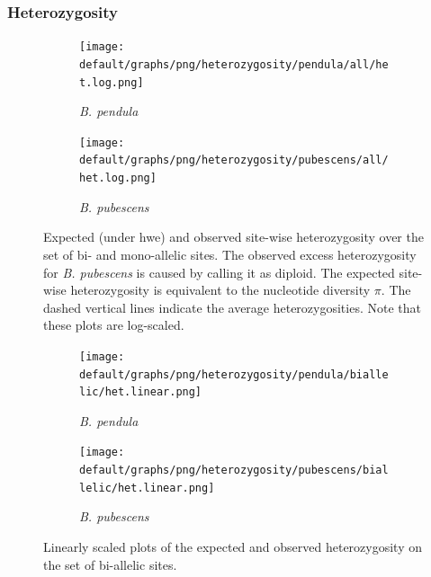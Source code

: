 \documentclass[hidelinks,11pt]{article}
\newcommand{\pendula}{\textit{B. pendula}}
\newcommand{\pubescens}{\textit{B. pubescens}}
\begin{document}
    \subsubsection{Heterozygosity}
    
    \begin{figure}[ht]
        \centering
        \begin{subfigure}[b]{0.485\textwidth}
            \centering
            \texttt{[image: default/graphs/png/heterozygosity/pendula/all/het.log.png]}
            \caption{\pendula{}}
            \label{fig:het_pendula}
        \end{subfigure}
        \hfill
        \begin{subfigure}[b]{0.485\textwidth}
            \centering
            \texttt{[image: default/graphs/png/heterozygosity/pubescens/all/het.log.png]}
            \caption{\pubescens{}}
            \label{fig:het_pubescens}
        \end{subfigure}
        \caption{Expected (under \acrshort{hwe}) and observed site-wise heterozygosity over the set of bi- and mono-allelic sites. The observed excess heterozygosity for \pubescens{} is caused by calling it as diploid. The expected site-wise heterozygosity is equivalent to the nucleotide diversity $\pi$. The dashed vertical lines indicate the average heterozygosities. Note that these plots are log-scaled.}
        \label{fig:het}
    \end{figure}

    \begin{figure}[H]
        \centering
        \begin{subfigure}[b]{0.49\textwidth}
            \centering
            \texttt{[image: default/graphs/png/heterozygosity/pendula/biallelic/het.linear.png]}
            \caption{\pendula{}}
            \label{fig:het_linear_pendula}
        \end{subfigure}
        \hfill
        \begin{subfigure}[b]{0.49\textwidth}
            \centering
            \texttt{[image: default/graphs/png/heterozygosity/pubescens/biallelic/het.linear.png]}
            \caption{\pubescens{}}
            \label{fig:het_linear_pubescens}
        \end{subfigure}
        \caption{Linearly scaled plots of the expected and observed heterozygosity on the set of bi-allelic sites. }
        \label{fig:het_linear}
    \end{figure}
\end{document}
